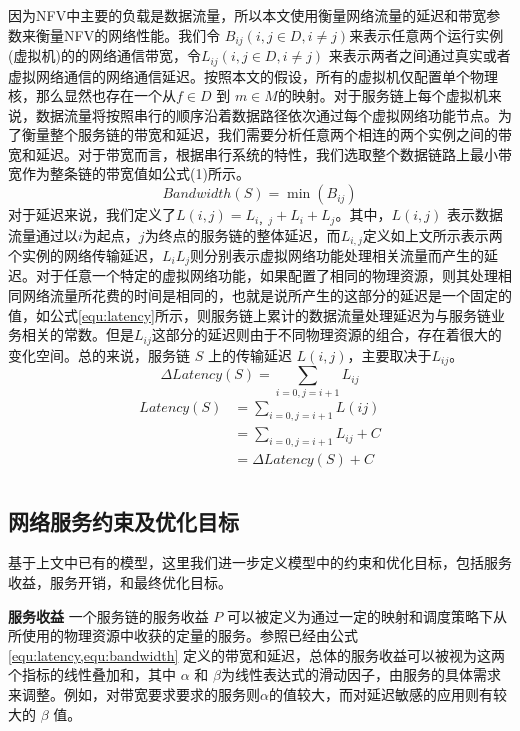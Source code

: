 因为NFV中主要的负载是数据流量，所以本文使用衡量网络流量的延迟和带宽参数来衡量NFV的网络性能。我们令 $B_{ij} (i,j \in D, i \neq j)$来表示任意两个运行实例(虚拟机)的的网络通信带宽，令$L_{ij}(i,j \in D ,i \neq j)$ 来表示两者之间通过真实或者虚拟网络通信的网络通信延迟。按照本文的假设，所有的虚拟机仅配置单个物理核，那么显然也存在一个从$f \in D$ 到 $m \in M$的映射。对于服务链上每个虚拟机来说，数据流量将按照串行的顺序沿着数据路径依次通过每个虚拟网络功能节点。为了衡量整个服务链的带宽和延迟，我们需要分析任意两个相连的两个实例之间的带宽和延迟。对于带宽而言，根据串行系统的特性，我们选取整个数据链路上最小带宽作为整条链的带宽值如公式(1)所示。
\begin{equation}
\label{equ:bandwidth}
Bandwidth(S) = \min{(B_{i j } )}  
\end{equation}
对于延迟来说，我们定义了$L(i,j) = L_{i，j} + L_{i} + L_{j}$。其中，$L(i,j)$ 表示数据流量通过以$i$为起点，$j$为终点的服务链的整体延迟，而$L_{i,j}$定义如上文所示表示两个实例的网络传输延迟，$L_{i}$$L_{j}$则分别表示虚拟网络功能处理相关流量而产生的延迟。对于任意一个特定的虚拟网络功能，如果配置了相同的物理资源，则其处理相同网络流量所花费的时间是相同的，也就是说所产生的这部分的延迟是一个固定的值，如公式\ref{equ:latency}所示，则服务链上累计的数据流量处理延迟为与服务链业务相关的常数。但是$L_{ij}$这部分的延迟则由于不同物理资源的组合，存在着很大的变化空间。总的来说，服务链 $S$ 上的传输延迟 $L(i,j)$，主要取决于$L_{ij}$。
\begin{equation}
\Delta Latency(S) = \sum_{i=0,j=i+1}{L_{ij}} 
\end{equation}
\begin{equation}
\label{equ:latency}
\begin{aligned}
Latency(S) & = \sum_{i=0,j=i+1}{L(ij)} \\
& = \sum_{i=0,j=i+1}{L_{ij}}  + C \\
& = \Delta Latency(S) + C  		  \\ 
\end{aligned}
\end{equation}

\subsection{网络服务约束及优化目标}
基于上文中已有的模型，这里我们进一步定义模型中的约束和优化目标，包括服务收益，服务开销，和最终优化目标。


\textbf{服务收益}{ }一个服务链的服务收益 $P$ 可以被定义为通过一定的映射和调度策略下从所使用的物理资源中收获的定量的服务。参照已经由公式 \ref{equ:latency,equ:bandwidth} 定义的带宽和延迟，总体的服务收益可以被视为这两个指标的线性叠加和，其中 $\alpha$ 和 $\beta$为线性表达式的滑动因子，由服务的具体需求来调整。例如，对带宽要求要求的服务则$\alpha$的值较大，而对延迟敏感的应用则有较大的 $\beta$ 值。


